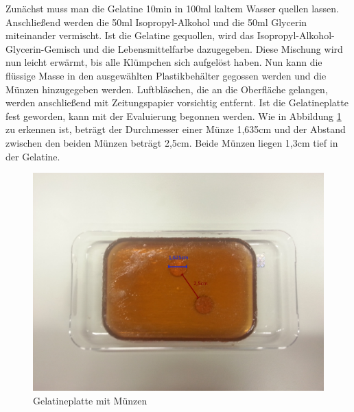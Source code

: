 Zunächst muss man die Gelatine 10min in 100ml kaltem Wasser quellen lassen. Anschließend werden die 50ml Isopropyl-Alkohol und die 50ml Glycerin miteinander vermischt. Ist die Gelatine gequollen, wird das Isopropyl-Alkohol-Glycerin-Gemisch und die Lebensmittelfarbe dazugegeben. Diese Mischung wird nun leicht erwärmt, bis alle Klümpchen sich aufgelöst haben. Nun kann die flüssige Masse in den ausgewählten Plastikbehälter gegossen werden und die Münzen hinzugegeben werden. Luftbläschen, die an die Oberfläche gelangen, werden anschließend mit Zeitungspapier vorsichtig entfernt. Ist die Gelatineplatte fest geworden, kann mit der Evaluierung begonnen werden. Wie in Abbildung \ref{fig:gelatineplatte} zu erkennen ist, beträgt der Durchmesser einer Münze 1,635cm und der Abstand zwischen den beiden Münzen beträgt 2,5cm. Beide Münzen liegen 1,3cm tief in der Gelatine.
\clearpage
\begin{figure}[h]
	\centering
	\includegraphics[width=1\textwidth]{Bilder/Evaluation/Gelatineplatte.jpg}
	\caption{Gelatineplatte mit Münzen}
	\label{fig:gelatineplatte}
\end{figure}

